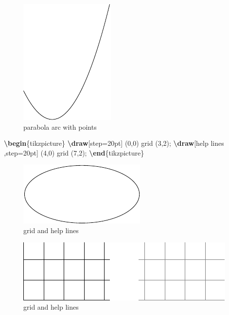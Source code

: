 \documentclass[
]{book}
\newenvironment{Shaded}{\begin{snugshade}}{\end{snugshade}}
\newcommand{\ExtensionTok}[1]{#1}
\newcommand{\FunctionTok}[1]{\textcolor[rgb]{0.13,0.29,0.53}{\textbf{#1}}}
\newcommand{\KeywordTok}[1]{\textcolor[rgb]{0.13,0.29,0.53}{\textbf{#1}}}
\newcommand{\NormalTok}[1]{#1}
\theoremstyle{definition}
\theoremstyle{definition}
\theoremstyle{definition}
\theoremstyle{definition}
\theoremstyle{remark}
\begin{document}
\begin{figure}
\includegraphics[width=0.25\linewidth]{202401311000-TikZ_files/figure-latex/unnamed-chunk-32-1} \caption{parabola arc with points}\label{fig:unnamed-chunk-32}
\end{figure}

\begin{Shaded}
\begin{Highlighting}[]
\KeywordTok{\textbackslash{}begin}\NormalTok{\{}\ExtensionTok{tikzpicture}\NormalTok{\}}
  \FunctionTok{\textbackslash{}draw}\NormalTok{[step=20pt] (0,0) grid (3,2);}
  \FunctionTok{\textbackslash{}draw}\NormalTok{[help lines ,step=20pt] (4,0) grid (7,2);}
\KeywordTok{\textbackslash{}end}\NormalTok{\{}\ExtensionTok{tikzpicture}\NormalTok{\}}
\end{Highlighting}
\end{Shaded}

\begin{figure}
\includegraphics[width=0.75\linewidth]{202401311000-TikZ_files/figure-latex/unnamed-chunk-34-1} \caption{grid and help lines}\label{fig:unnamed-chunk-34}
\end{figure}

\begin{figure}
\includegraphics[width=0.75\linewidth]{202401311000-TikZ_files/figure-latex/unnamed-chunk-35-1} \caption{grid and help lines}\label{fig:unnamed-chunk-35}
\end{figure}
\end{document}
